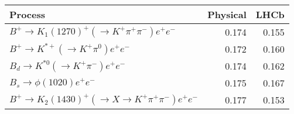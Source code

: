 \begin{tabular}{lrr}
\toprule
Process & Physical & LHCb \\
\midrule
$B^+\to K_1(1270)^+(\to K^+\pi^+\pi^-)e^+e^-$ & 0.174 & 0.155 \\
$B^+\to K^{*+}(\to K^+\pi^0)e^+e^-$ & 0.172 & 0.160 \\
$B_d\to K^{*0}(\to K^+\pi^-)e^+e^-$ & 0.174 & 0.162 \\
$B_s\to \phi(1020)e^+e^-$ & 0.175 & 0.167 \\
$B^+\to K_2(1430)^+(\to X \to K^+\pi^+\pi^-)e^+e^-$ & 0.177 & 0.153 \\
\bottomrule
\end{tabular}
